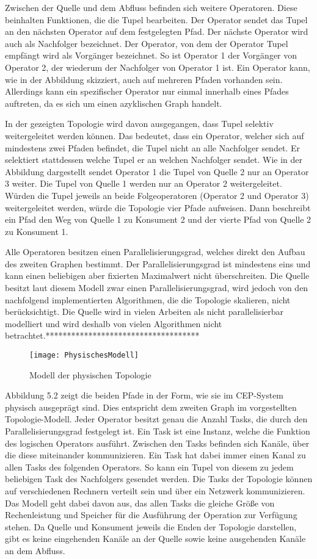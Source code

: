Zwischen der Quelle und dem Abfluss befinden sich weitere Operatoren. 
Diese beinhalten Funktionen, die die Tupel bearbeiten.
Der Operator sendet das Tupel an den nächsten Operator auf dem festgelegten Pfad.
Der nächste Operator wird auch als Nachfolger bezeichnet.
Der Operator, von dem der Operator Tupel empfängt wird als Vorgänger bezeichnet.
So ist Operator 1 der Vorgänger von Operator 2, der wiederum der Nachfolger von Operator 1 ist.
Ein Operator kann, wie in der Abbildung skizziert, auch auf mehreren Pfaden vorhanden sein. 
Allerdings kann ein spezifischer Operator nur einmal innerhalb eines Pfades auftreten, da es sich um einen azyklischen Graph handelt.

In der gezeigten Topologie wird davon ausgegangen, dass Tupel selektiv weitergeleitet werden können.
Das bedeutet, dass ein Operator, welcher sich auf mindestens zwei Pfaden befindet, die Tupel nicht an alle Nachfolger sendet.
Er selektiert stattdessen welche Tupel er an welchen Nachfolger sendet.
Wie in der Abbildung dargestellt sendet Operator 1 die Tupel von Quelle 2 nur an Operator 3 weiter.
Die Tupel von Quelle 1 werden nur an Operator 2 weitergeleitet.
Würden die Tupel jeweils an beide Folgeoperatoren (Operator 2 und Operator 3) weitergeleitet werden, würde die Topologie vier Pfade aufweisen.
Dann beschreibt ein Pfad den Weg von Quelle 1 zu Konsument 2 und der vierte Pfad von Quelle 2 zu Konsument 1.

Alle Operatoren besitzen einen Parallelisierungsgrad, welches direkt den Aufbau des zweiten Graphen bestimmt. 
Der Parallelisierungsgrad ist mindestens eins und kann einen beliebigen aber fixierten Maximalwert nicht überschreiten. 
Die Quelle besitzt laut diesem Modell zwar einen Parallelisierungsgrad, wird jedoch von den nachfolgend implementierten Algorithmen, die die Topologie skalieren, nicht berücksichtigt.
Die Quelle wird in vielen Arbeiten als nicht parallelisierbar modelliert und wird deshalb von vielen Algorithmen nicht betrachtet.************************************

\begin{figure}
\texttt{[image: PhysischesModell]}
\caption{Modell der physischen Topologie}
\end{figure}

Abbildung 5.2 zeigt die beiden Pfade in der Form, wie sie im CEP-System physisch ausgeprägt sind.
Dies entspricht dem zweiten Graph im vorgestellten Topologie-Modell.
Jeder Operator besitzt genau die Anzahl Tasks, die durch den Parallelisierungsgrad festgelegt ist.
Ein Task ist eine Instanz, welche die Funktion des logischen Operators ausführt.
Zwischen den Tasks befinden sich Kanäle, über die diese miteinander kommunizieren.
Ein Task hat dabei immer einen Kanal zu allen Tasks des folgenden Operators.
So kann ein Tupel von diesem zu jedem beliebigen Task des Nachfolgers gesendet werden.
Die Tasks der Topologie können auf verschiedenen Rechnern verteilt sein und über ein Netzwerk kommunizieren.
Das Modell geht dabei davon aus, das allen Tasks die gleiche Größe von Rechenleistung und Speicher für die Ausführung der Operation zur Verfügung stehen.
Da Quelle und Konsument jeweils die Enden der Topologie darstellen, gibt es keine eingehenden Kanäle an der Quelle sowie keine ausgehenden Kanäle an dem Abfluss.

